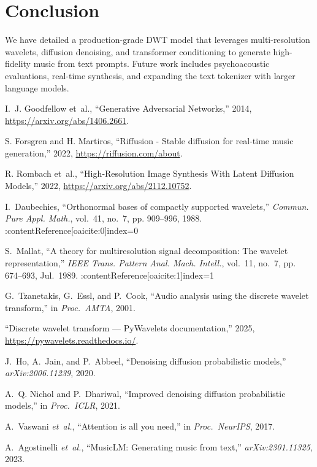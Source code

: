 \documentclass[12pt]{report}
\begin{document}
\chapter{Conclusion}

We have detailed a production-grade DWT model that leverages multi-resolution wavelets, diffusion denoising, and transformer conditioning to generate high-fidelity music from text prompts. Future work includes psychoacoustic evaluations, real-time synthesis, and expanding the text tokenizer with larger language models.

\begin{thebibliography}{99}

I.~J. Goodfellow et~al., “Generative Adversarial Networks,” 2014, \url{https://arxiv.org/abs/1406.2661}.

S. Forsgren and H. Martiros, “Riffusion - Stable diffusion for real-time music generation,” 2022, \url{https://riffusion.com/about}.

R. Rombach et~al., “High‐Resolution Image Synthesis With Latent Diffusion Models,” 2022, \url{https://arxiv.org/abs/2112.10752}.

I.~Daubechies, “Orthonormal bases of compactly supported wavelets,”
  \emph{Commun. Pure Appl. Math.}, vol.~41, no.~7, pp. 909--996, 1988. :contentReference[oaicite:0]{index=0}

S.~Mallat, “A theory for multiresolution signal decomposition: The wavelet
  representation,” \emph{IEEE Trans. Pattern Anal. Mach. Intell.}, vol.~11,
  no.~7, pp. 674--693, Jul.\ 1989. :contentReference[oaicite:1]{index=1}

G.~Tzanetakis, G.~Essl, and P.~Cook, “Audio analysis using the discrete
  wavelet transform,” in \emph{Proc.\ AMTA}, 2001.

“Discrete wavelet transform — PyWavelets documentation,” 2025,
  \url{https://pywavelets.readthedocs.io/}. 

J.~Ho, A.~Jain, and P.~Abbeel, “Denoising diffusion probabilistic models,”
  \emph{arXiv:2006.11239}, 2020. 

A.~Q. Nichol and P.~Dhariwal, “Improved denoising diffusion probabilistic
  models,” in \emph{Proc.\ ICLR}, 2021. 

A.~Vaswani \emph{et~al.}, “Attention is all you need,” in \emph{Proc.\ NeurIPS},
  2017. 

A.~Agostinelli \emph{et~al.}, “MusicLM: Generating music from text,”
  \emph{arXiv:2301.11325}, 2023. 

\end{thebibliography}
\end{document}

